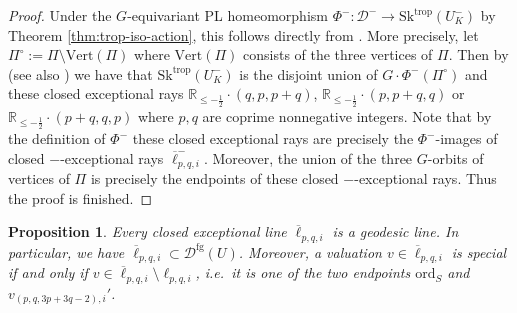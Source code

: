 \documentclass[reqno, 12pt]{amsart}
\newtheorem{prop}{Proposition}[section]
\theoremstyle{definition}
\newcommand{\bR}{\mathbb{R}}
\newcommand{\cD}{\mathcal{D}}
\newcommand{\ord}{\mathrm{ord}}
\newcommand{\trop}{\mathrm{trop}}
\newcommand{\Sk}{\mathrm{Sk}}
\newcommand{\rfg}{\mathrm{fg}}
\newcommand{\oell}{\overline{\ell}}
\newcommand{\VPi}{\mathrm{Vert}(\Pi)}
\numberwithin{equation}{section}
\begin{document}
\begin{proof}
Under the $G$-equivariant PL homeomorphism $\Phi^{-}:\cD^-\to \Sk^{\trop}(U_K^-)$ by Theorem \ref{thm:trop-iso-action}, this follows directly from \cite{Jan23}. More precisely, let $\Pi^\circ:=\Pi\setminus \VPi$ where $\VPi$ consists of the three vertices of $\Pi$. Then by \cite[Theorem 9.3 and Proposition 9.4]{Jan23} (see also \cite[Section 1.2]{Jan23}) we have that $\Sk^{\trop}(U_K^-)$ is the disjoint union of $G\cdot \Phi^-(\Pi^\circ)$ and these closed exceptional rays $\bR_{\leq - \frac{1}{2}}\cdot (q, p, p+q) $, $\bR_{\leq -  \frac{1}{2}}\cdot (p, p+q,q) $ or $\bR_{\leq -  \frac{1}{2}}\cdot (p+q, q, p) $  where $p,q$ are coprime nonnegative integers. Note that by the definition of $\Phi^-$ these closed exceptional rays are precisely the $\Phi^-$-images of closed $-$-exceptional rays $\oell_{p,q,i}^-$. Moreover, the union of the three $G$-orbits of vertices of $\Pi$ is precisely the endpoints of these closed $-$-exceptional rays. Thus the proof is finished. 
\end{proof}

\begin{prop}\label{prop:exc-lines-fg}
Every closed exceptional line $\oell_{p,q,i}$ is a geodesic line. In particular, we have $\oell_{p,q,i}\subset \cD^{\rfg}(U)$. Moreover, a valuation $v\in \oell_{p,q,i}$ is special if and only if $v\in \oell_{p,q,i}\setminus \ell_{p,q,i}$, i.e.\ it is one of the two endpoints $\ord_S$ and $v_{(p,q,3p+3q-2),i}'$.
\end{prop}
\end{document}
